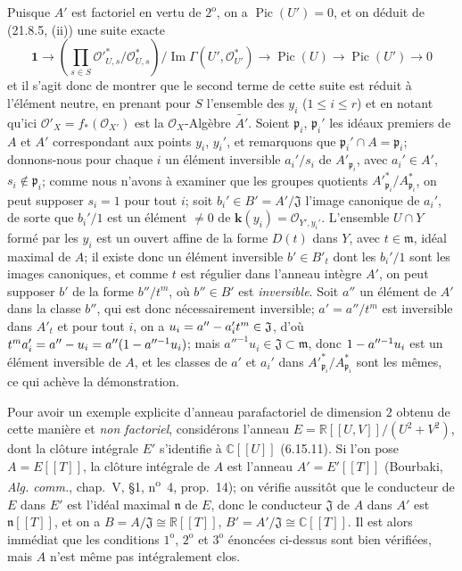 \begin{examples}[21.13.9]
Puisque $A'$ est factoriel en vertu de
$2^{\mathrm o}$, on a $\operatorname{Pic}(U')=0$, et on déduit de (21.8.5, (ii)) une
suite exacte
\[
  \mathbf{1}\longrightarrow
  \left(\prod_{s\in S}
  \mathcal O'^*_{U,s}/\mathcal O^*_{U,s}\right)
  \big/\operatorname{Im}\Gamma(U',\mathcal O_{U'}^*)
  \longrightarrow\operatorname{Pic}(U)\longrightarrow\operatorname{Pic}(U')
  \longrightarrow0
\]
et il s'agit donc de montrer que le second terme de cette suite est réduit à l'élément
neutre, en prenant pour $S$ l'ensemble des $y_i$ ($1\leq i\leq r$) et en notant
qu'ici $\mathcal O'_X=f_*(\mathcal O_{X'})$ est la $\mathcal O_X$-Algèbre $\widetilde{A'}$. Soient
$\mathfrak p_i$, $\mathfrak p_i'$ les idéaux premiers de $A$ et $A'$ correspondant
aux points $y_i$, $y_i'$, et remarquons que $\mathfrak p_i'\cap A=\mathfrak p_i$;
donnons-nous pour chaque $i$ un élément inversible $a_i'/s_i$ de
$A'_{\mathfrak p_i}$, avec $a_i'\in A'$, $s_i\notin\mathfrak p_i$; comme nous
n'avons à examiner que les groupes quotients
$A'^*_{\mathfrak p_i}/A^*_{\mathfrak p_i}$, on peut supposer $s_i=1$ pour tout
$i$; soit $b_i'\in B'=A'/\mathfrak J$ l'image canonique de $a_i'$, de sorte que
$b_i'/1$ est un élément $\neq0$ de $\boldsymbol{k}(y_i)=\mathcal O_{Y',y_i'}$. L'ensemble
$U\cap Y$ formé par les $y_i$ est un ouvert affine de la forme $D(t)$ dans $Y$, avec
$t\in\mathfrak m$, idéal maximal de $A$; il existe donc un élément inversible
$b'\in B'_t$ dont les $b_i'/1$ sont les images canoniques, et comme $t$ est régulier
dans l'anneau intègre $A'$, on peut supposer $b'$ de la forme $b''/t^m$, où
$b''\in B'$ est \emph{inversible}. Soit $a''$ un élément de $A'$ dans la classe $b''$, qui
est donc nécessairement inversible; $a'=a''/t^m$ est inversible dans $A'_t$ et pour
tout $i$, on a $u_i=a''- a_i't^m\in\mathfrak J$, d'où $t^m a_i'=a''- u_i=a''(1- a''^{-1}u_i)$;
mais $a''^{-1}u_i\in\mathfrak J\subset\mathfrak m$, donc $1- a''^{-1}u_i$ est un
élément inversible de $A$, et les classes de $a'$ et $a_i'$ dans
$A'^*_{\mathfrak p_i}/A^*_{\mathfrak p_i}$ sont les mêmes, ce qui achève la
démonstration.

Pour avoir un exemple explicite d'anneau parafactoriel de dimension $2$ obtenu de
cette manière et \emph{non factoriel}, considérons l'anneau
$E=\mathbb R[[U,V]]/(U^2+V^2)$, dont la clôture intégrale $E'$ s'identifie à $\mathbb C[[U]]$ (6.15.11). Si l'on pose
$A=E[[T]]$, la clôture intégrale de $A$ est l'anneau $A'=E'[[T]]$ (Bourbaki,
\emph{Alg. comm.}, chap.~V, \S1, n\textsuperscript{o}~4, prop.~14); on vérifie
aussitôt que le conducteur de $E$ dans $E'$ est l'idéal maximal $\mathfrak n$ de
$E$, donc le conducteur $\mathfrak J$ de $A$ dans $A'$ est $\mathfrak n[[T]]$, et on
a $B=A/\mathfrak J\cong\mathbb R[[T]]$, $B'=A'/\mathfrak J\cong\mathbb C[[T]]$.
Il est alors immédiat que les conditions $1^{\mathrm o}$, $2^{\mathrm o}$ et
$3^{\mathrm o}$ énoncées ci-dessus sont bien vérifiées, mais $A$ n'est même pas
intégralement clos.


\end{examples}
